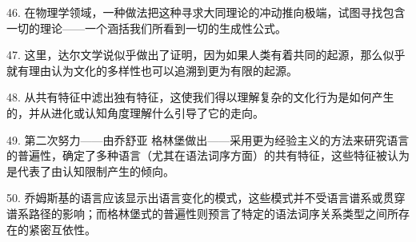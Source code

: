 46. 在物理学领域，一种做法把这种寻求大同理论的冲动推向极端，试图寻找包含一切的理论——一个涵括我们所看到一切的生成性公式。

47. 这里，达尔文学说似乎做出了证明，因为如果人类有着共同的起源，那么似乎就有理由认为文化的多样性也可以追溯到更为有限的起源。

48. 从共有特征中滤出独有特征，这使我们得以理解复杂的文化行为是如何产生的，并从进化或认知角度理解什么引导了它的走向。

49. 第二次努力——由乔舒亚 格林堡做出——采用更为经验主义的方法来研究语言的普遍性，确定了多种语言（尤其在语法词序方面）的共有特征，这些特征被认为是代表了由认知限制产生的倾向。

50. 乔姆斯基的语言应该显示出语言变化的模式，这些模式并不受语言谱系或贯穿谱系路径的影响；而格林堡式的普遍性则预言了特定的语法词序关系类型之间所存在的紧密互依性。